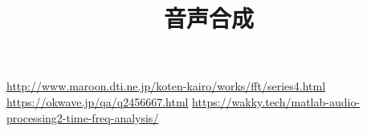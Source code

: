 \documentclass[11pt,a4j]{jarticle}
\title{音声合成}
\begin{document}
\maketitle

\clearpage





\begin{thebibliography}{3}
 \url{http://www.maroon.dti.ne.jp/koten-kairo/works/fft/series4.html}
 \url{https://okwave.jp/qa/q2456667.html}
 \url{https://wakky.tech/matlab-audio-processing2-time-freq-analysis/}
\end{thebibliography}
\end{document}
